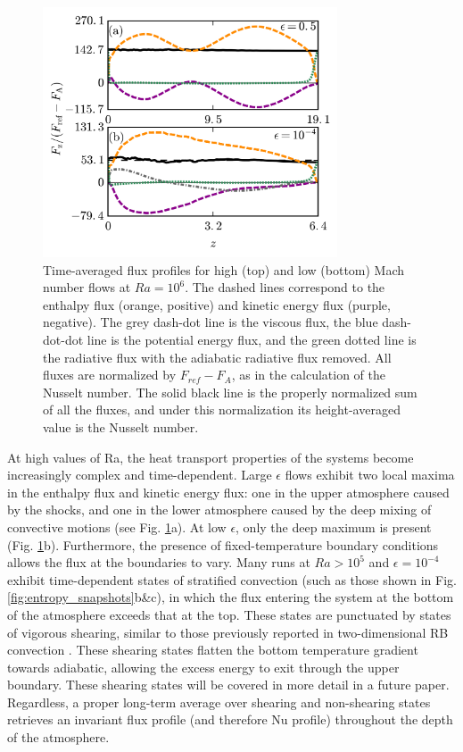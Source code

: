 \documentclass[aps, prl, twocolumn, nofootinbib, groupedaddress, amsfonts, amssymb, amsmath]{revtex4-1}
\begin{document}
\begin{figure}[t]
\includegraphics[width=3.4375in]{./figs/fluxes_fig.png}
\caption{Time-averaged flux profiles for high (top) and low (bottom) Mach number flows at $Ra = 10^6$.  
The dashed lines correspond to the
enthalpy flux (orange, positive) and kinetic energy flux (purple, negative).  The grey dash-dot line is the
viscous flux, the blue dash-dot-dot line is the potential energy flux, 
and the green dotted line is the radiative flux with the adiabatic radiative flux removed. All
fluxes are normalized by $F_{ref} - F_A$, as in the calculation of the Nusselt number.  The solid black line is
the properly normalized sum of all the fluxes, and under this normalization its height-averaged value is the
Nusselt number.
\label{fig:flux_profiles} }
\end{figure}

At high values of Ra, the heat transport properties of the systems become increasingly complex and time-dependent.
Large $\epsilon$ flows exhibit two local maxima in the enthalpy flux and kinetic energy flux: one in the upper 
atmosphere caused by the shocks, and one in the lower atmosphere caused by the deep mixing of convective motions
(see Fig. \ref{fig:flux_profiles}a).
At low $\epsilon$, only the deep maximum is present (Fig. \ref{fig:flux_profiles}b).  
Furthermore, the presence
of fixed-temperature boundary conditions allows the flux at the boundaries to vary.  Many runs at $Ra > 10^5$ and
$\epsilon = 10^{-4}$ exhibit time-dependent states of stratified convection (such as those shown in 
Fig. \ref{fig:entropy_snapshots}b\&c), in which the flux entering the system at the bottom of the atmosphere exceeds
that at the top.  These states are punctuated by states of vigorous shearing, similar to those previously
reported in two-dimensional RB convection \cite{goluskin&all2014}.  These shearing states flatten the bottom temperature
gradient towards adiabatic, allowing the excess energy to exit through the upper boundary.  These shearing
states will be covered in more detail in a future paper.  Regardless, a proper long-term average over shearing
and non-shearing states retrieves an invariant flux profile (and therefore Nu profile) throughout the depth
of the atmosphere. 
\end{document}
